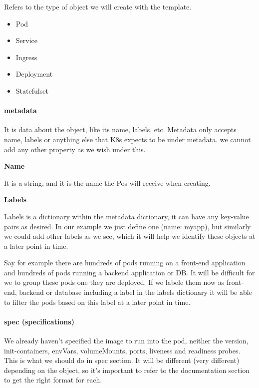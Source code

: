 \documentclass{article}
\begin{document}
Refers to the type of object we will create with the template.

\begin{itemize}
    \item Pod
    \item Service
    \item Ingress
    \item Deployment
    \item Statefulset
\end{itemize}

\paragraph{metadata}

It is data about the object, like its name, labels, etc. Metadata only accepts name, labels or anything else that K8s expects to be under metadata. we cannot add any other property as we wish under this.

\textbf{Name} 

It is a string, and it is the name the Pos will receive when creating.

\textbf{Labels}

Labels is a dictionary within the metadata dictionary, it can have any key-value pairs as desired. In our example we just define one (name: myapp), but similarly we could add other labels as we see, which it will help we identify these objects at a later point in time. 

Say for example there are hundreds of pods running on a front-end application and hundreds of pods running a backend application or DB. It will be difficult for we to group these pods one they are deployed. If we labele them now as front-end, backend or database including a label in the labels dictionary it will be able to filter the pods based on this label at a later point in time.

\paragraph{spec (specifications)}

We already haven't specified the image to run into the pod, neither the version, init-containers, envVars, volumeMounts, ports, liveness and readiness probes. This is what we should do in spec section. It will be different (very different) depending on the object, so it's important to refer to the documentation section to get the right format for each.
\end{document}
